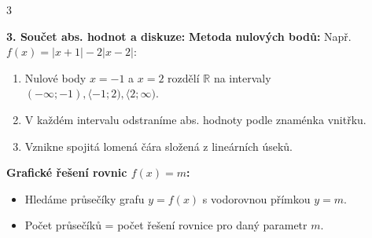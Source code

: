\documentclass[9pt,a4paper]{article}
\begin{document}
\begin{tcolorbox}[secbox,title=OKRUH 5: ABSOLUTNÍ HODNOTA V ROVNICÍCH, NEROVNICÍCH A GRAFECH]
\begin{multicols}{3}
\begin{center}
\end{center}

\columnbreak

\textbf{3. Součet abs. hodnot a diskuze:}
\textbf{Metoda nulových bodů:}
Např. $f(x) = |x+1| - 2|x-2|$:
\begin{enumerate}
  \item Nulové body $x = -1$ a $x = 2$ rozdělí $\mathbb{R}$ na intervaly $(-\infty;-1), \langle-1;2), \langle2;\infty)$.
  \item V každém intervalu odstraníme abs. hodnoty podle znaménka vnitřku.
  \item Vznikne spojitá lomená čára složená z lineárních úseků.
\end{enumerate}
\textbf{Grafické řešení rovnic $f(x) = m$:}
\begin{itemize}
  \item Hledáme průsečíky grafu $y = f(x)$ s vodorovnou přímkou $y = m$.
  \item Počet průsečíků = počet řešení rovnice pro daný parametr $m$.
\end{itemize}

\end{multicols}
\end{tcolorbox}
\end{document}
